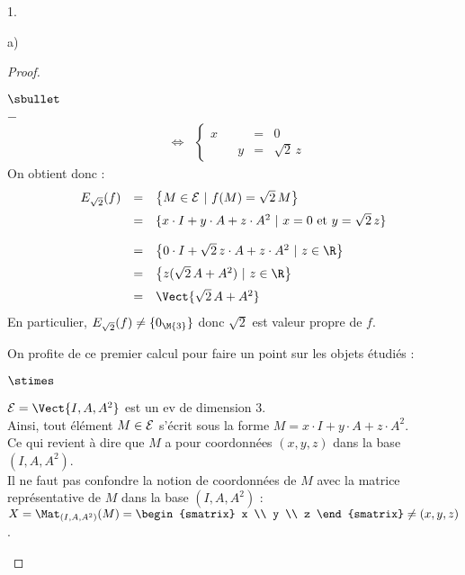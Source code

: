 \documentclass[11pt]{article}%
\begin{document}
\begin{noliste}{1.}
\begin{noliste}{a)}
\begin{proof}
\begin{noliste}{$\sbullet$}
\begin{noliste}{$-$}
\[\begin{array}{rcl}
      & \Longleftrightarrow & \left\{
      \begin{array}{rrrcl}
       x & & & = & 0\\
       & & y & = & \sqrt{2} \, z
      \end{array}
      \right.
     \end{array}
    \]
    On obtient donc :
    \[
     \begin{array}{rcl}
      E_{\sqrt{2}}(f) & = & \left\{ M\in\mathcal{E} \ | \ f(M)= 
      \sqrt{2}\, M \right\}
      \\[.2cm]
      & = & \{ x \cdot I+y \cdot A+z \cdot A^2 \ | \
       x = 0 \mbox{ et }
       y = \sqrt{2} \, z
      \}
      \\[.4cm]
      & = & \left\{ 0\cdot I + \sqrt{2} \, z \cdot A + z \cdot A^2 
      \ | \ z\in\R\right\}
      \\[.2cm]
      & = & \left\{ z(\sqrt{2} \, A + A^2) 
      \ | \ z\in\R\right\}
      \\[.2cm]
      & = & \Vect{\sqrt{2} \, A+A^2}
     \end{array}
    \]
    En particulier, $E_{\sqrt{2}}(f)\neq \{0_{\M{3}}\}$ donc $\sqrt{2}$ 
    est valeur propre de $f$.
    \end{noliste}
          
    \newpage
          
    \begin{remark}%
          On profite de ce premier calcul pour faire un point sur les
          objets étudiés :
          \begin{noliste}{$\stimes$}
            \setlength{\itemsep}{2mm}
          \item ${\cal E} = \Vect{I, A, A^2}$ est un ev de dimension
            $3$.\\[.2cm]
            Ainsi, tout élément $M \in {\cal E}$ s'écrit sous la
            forme $M = x \cdot I + y \cdot A + z \cdot A^2$.\\[.2cm]
            Ce qui revient à dire que $M$ a pour coordonnées
            $(x, y, z)$ dans la base $(I, A, A^2)$.\\[.2cm]
            Il ne faut pas confondre la notion de coordonnées de $M$
            avec la matrice représentative de $M$ dans la base $(I, A,
            A^2)$ : $X = \Mat_{(I,A, A^2)}(M) =
            \begin{smatrix}
              x \\
              y \\
              z
            \end{smatrix}
            \neq (x, y, z)
            $.


\end{noliste}
\end{remark}
\end{noliste}
\end{proof}
\end{noliste}
\end{noliste}
\end{document}
